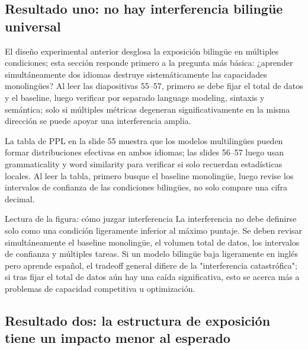 \subsection{Resultado uno: no hay interferencia bilingüe universal}

El diseño experimental anterior desglosa la exposición bilingüe en múltiples condiciones; esta sección responde primero a la pregunta más básica: ¿aprender simultáneamente dos idiomas destruye sistemáticamente las capacidades monolingües? Al leer las diapositivas 55--57, primero se debe fijar el total de datos y el baseline, luego verificar por separado language modeling, sintaxis y semántica; solo si múltiples métricas degeneran significativamente en la misma dirección se puede apoyar una interferencia amplia.

La tabla de PPL en la slide 55 muestra que los modelos multilingües pueden formar distribuciones efectivas en ambos idiomas; las slides 56--57 luego usan grammaticality y word similarity para verificar si solo recuerdan estadísticas locales. Al leer la tabla, primero busque el baseline monolingüe, luego revise los intervalos de confianza de las condiciones bilingües, no solo compare una cifra decimal.




\begin{knowledgebox}{Lectura de la figura: cómo juzgar interferencia}
La interferencia no debe definirse solo como una condición ligeramente inferior al máximo puntaje. Se deben revisar simultáneamente el baseline monolingüe, el volumen total de datos, los intervalos de confianza y múltiples tareas. Si un modelo bilingüe baja ligeramente en inglés pero aprende español, el tradeoff general difiere de la "interferencia catastrófica"; si tras fijar el total de datos aún hay una caída significativa, esto se acerca más a problemas de capacidad competitiva u optimización.
\end{knowledgebox}

\subsection{Resultado dos: la estructura de exposición tiene un impacto menor al esperado}

